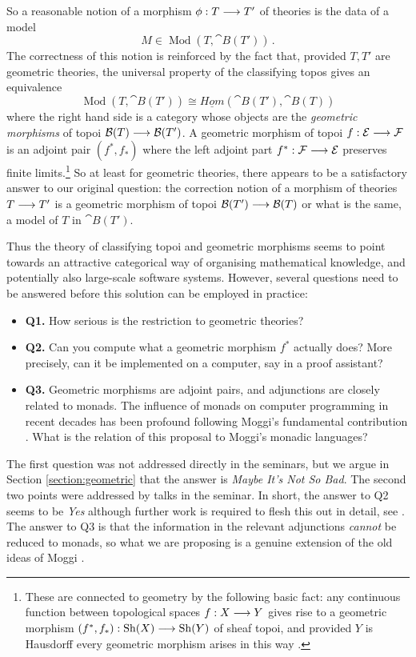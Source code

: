 \documentclass[english,letter paper,12pt,reqno]{article}
\theoremstyle{example}
\begin{document}
So a reasonable notion of a morphism $\phi: T \longrightarrow T'$ of theories is the data of a model
\[
M \in \operatorname{Mod}(T, \cat{B}(T'))\,.
\]
The correctness of this notion is reinforced by the fact that, provided $T,T'$ are geometric theories, the universal property of the classifying topos gives an equivalence
\[
\operatorname{Mod}(T, \cat{B}(T')) \cong \underline{Hom}( \cat{B}(T'), \cat{B}(T) )
\]
where the right hand side is a category whose objects are the \emph{geometric morphisms} of topoi $\mathcal{B}(T) \longrightarrow \mathcal{B}(T')$. A geometric morphism of topoi $f: \mathcal{E} \longrightarrow \mathcal{F}$ is an adjoint pair $(f^*, f_*)$ where the left adjoint part $f^*: \mathcal{F} \longrightarrow \mathcal{E}$ preserves finite limits.\footnote{These are connected to geometry by the following basic fact: any continuous function between topological spaces $f: X \longrightarrow Y$ gives rise to a geometric morphism $(f^*, f_*): \operatorname{Sh}(X) \longrightarrow \operatorname{Sh}(Y)$ of sheaf topoi, and provided $Y$ is Hausdorff every geometric morphism arises in this way \cite[\S VII.1]{topos}.} So at least for geometric theories, there appears to be a satisfactory answer to our original question: the correction notion of a morphism of theories $T \longrightarrow T'$ is a geometric morphism of topoi $\mathcal{B}(T') \longrightarrow \mathcal{B}(T)$ or what is the same, a model of $T$ in $\cat{B}(T')$. 
\vspace{0.2cm}

Thus the theory of classifying topoi and geometric morphisms seems to point towards an attractive categorical way of organising mathematical knowledge, and potentially also large-scale software systems. However, several questions need to be answered before this solution can be employed in practice:
\begin{itemize}
\item \textbf{Q1.} How serious is the restriction to geometric theories?
\item \textbf{Q2.} Can you compute what a geometric morphism $f^*$ actually does? More precisely, can it be implemented on a computer, say in a proof assistant?
\item \textbf{Q3.} Geometric morphisms are adjoint pairs, and adjunctions are closely related to monads. The influence of monads on computer programming in recent decades has been profound \cite{benton} following Moggi's fundamental contribution \cite{moggi}. What is the relation of this proposal to Moggi's monadic languages?
\end{itemize}
The first question was not addressed directly in the seminars, but we argue in Section \ref{section:geometric} that the answer is \emph{Maybe It's Not So Bad}. The second two points were addressed by talks in the seminar. In short, the answer to Q2 seems to be \emph{Yes} although further work is required to flesh this out in detail, see \cite[Lectures 12,15]{risingseminar}. The answer to Q3 is that the information in the relevant adjunctions \emph{cannot} be reduced to monads, so what we are proposing is a genuine extension of the old ideas of Moggi \cite[Lecture 15]{risingseminar}. 
\end{document}
